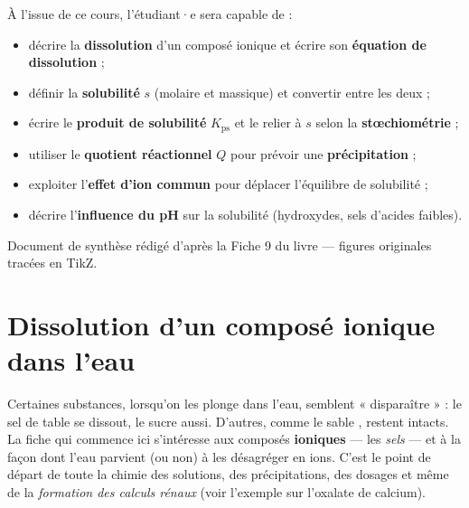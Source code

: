 \documentclass[11pt,a4paper]{article}
\newcommand{\Kps}{K_{\mathrm{ps}}}
\begin{document}
\vspace{0.3cm}

\begin{tcolorbox}[boxbase,colback=primary!5,colframe=primary,width=15cm,
    title={\textsc{Objectifs pédagogiques de la fiche}}]
À l'issue de ce cours, l'étudiant·e sera capable de :
\begin{itemize}[leftmargin=1.6em,topsep=2pt,itemsep=1pt]
  \item décrire la \textbf{dissolution} d'un composé ionique et écrire son \textbf{équation de dissolution} ;
  \item définir la \textbf{solubilité} $s$ (molaire et massique) et convertir entre les deux ;
  \item écrire le \textbf{produit de solubilité} $\Kps$ et le relier à $s$ selon la \textbf{stœchiométrie} ;
  \item utiliser le \textbf{quotient réactionnel} $Q$ pour prévoir une \textbf{précipitation} ;
  \item exploiter l'\textbf{effet d'ion commun} pour déplacer l'équilibre de solubilité ;
  \item décrire l'\textbf{influence du pH} sur la solubilité (hydroxydes, sels d'acides faibles).
\end{itemize}
\end{tcolorbox}

\vspace{0.3cm}
{\small\color{black!60} Document de synthèse rédigé d'après la Fiche 9 du livre — figures originales tracées en TikZ.}
\par
\endgroup

\newpage
\renewcommand{\contentsname}{\textcolor{primarydark}{Table des matières}}
\tableofcontents
\thispagestyle{fancy}
\newpage

\section{Dissolution d'un composé ionique dans l'eau}
Certaines substances, lorsqu'on les plonge dans l'eau, semblent « disparaître » : le sel de table
 se dissout, le sucre aussi. D'autres, comme le sable , restent intacts. La fiche
qui commence ici s'intéresse aux composés \textbf{ioniques} — les \emph{sels} — et à la façon dont
l'eau parvient (ou non) à les désagréger en ions. C'est le point de départ de toute la chimie des
solutions, des précipitations, des dosages et même de la \emph{formation des calculs rénaux}
(voir l'exemple sur l'oxalate de calcium).
\end{document}
